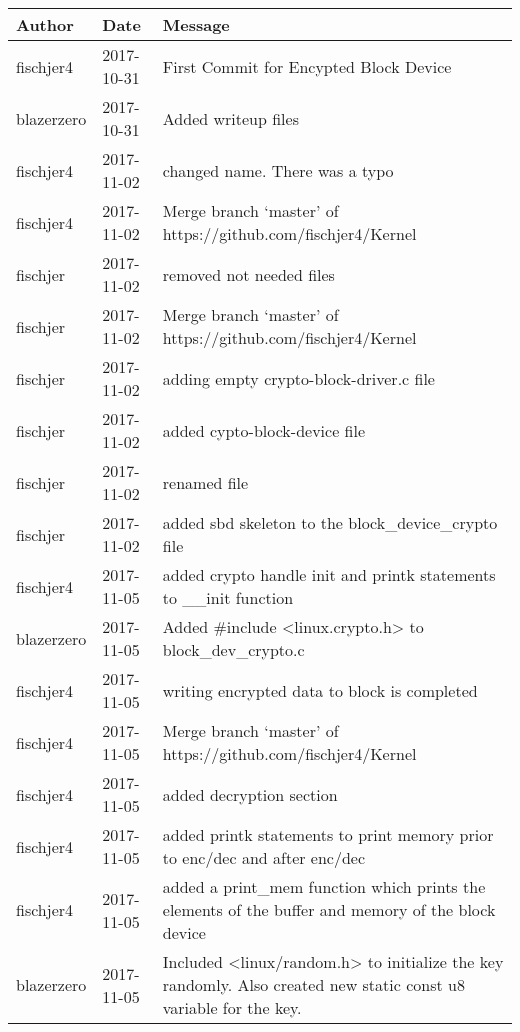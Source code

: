 \documentclass[draftclsnofoot, onecolumn, 10pt, compsoc]{IEEEtran}
\begin{document}
	
			\begin{center}
				\begin{longtabu} to \textwidth {| X[4,l] | X[3,c] | X[8,l] |}
					\hline
					\textbf{Author} & \textbf{Date} & \textbf{Message} \\ \hline
					fischjer4 & 2017-10-31 & First Commit for Encypted Block Device \\ \hline
					blazerzero & 2017-10-31 & Added writeup files \\ \hline
					fischjer4 & 2017-11-02 & changed name. There was a typo \\ \hline
					fischjer4 & 2017-11-02 & Merge branch `master' of https://github.com/fischjer4/Kernel \\ \hline
					fischjer & 2017-11-02 & removed not needed files \\ \hline
					fischjer & 2017-11-02 & Merge branch `master' of https://github.com/fischjer4/Kernel \\ \hline
					fischjer & 2017-11-02 & adding empty crypto-block-driver.c file \\ \hline
					fischjer & 2017-11-02 & added cypto-block-device file \\ \hline
					fischjer & 2017-11-02 & renamed file \\ \hline
					fischjer & 2017-11-02 & added sbd skeleton to the block\_device\_crypto file \\ \hline
					fischjer4 & 2017-11-05 & added crypto handle init and printk statements to \_\_init function \\ \hline
					blazerzero & 2017-11-05 & Added \#include \textless{}linux.crypto.h\textgreater{} to block\_dev\_crypto.c \\ \hline
					fischjer4 & 2017-11-05 & writing encrypted data to block is completed \\ \hline
					fischjer4 & 2017-11-05 & Merge branch `master' of https://github.com/fischjer4/Kernel \\ \hline
					fischjer4 & 2017-11-05 & added decryption section \\ \hline
					fischjer4 & 2017-11-05 & added printk statements to print memory prior to enc/dec and after enc/dec \\ \hline
					fischjer4 & 2017-11-05 & added a print\_mem function which prints the elements of the buffer and memory of the block device \\ \hline
					blazerzero & 2017-11-05 & Included \textless{}linux/random.h\textgreater{} to initialize the key randomly. Also created new static const u8 variable for the key. \\ \hline

\end{longtabu}
\end{center}
\end{document}
